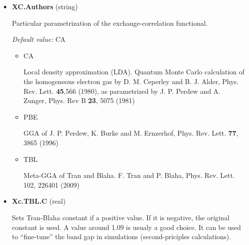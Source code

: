 \documentclass[11pt]{article}
\begin{document}
\begin{itemize}
  It is usual to have $m_{jj}$ an even number and $d_j = 0.5$.  For hexagonal crystals
  and the conventional axis, it is also usual/convenient to have $m_{11}=m_{22}$ a
  multiple of three.  These are recipes that minimize the number of irreducible points
  and avoid breaking symmetry.

  The tool \texttt{Tools/cpwin\_kmesh.f90} (section~\ref{sec:kmesh}) chooses a mesh with
  the symmetry of the lattice for a given quality, and evaluates the mesh of an existing file.

  If the matrix is diagonal and some diagonal elements are non-positive they will
  default to $m_{ii}=1$, printing a warning.  The program stops if the matrix is singular.

\item{\bf  XC.Authors} (string)

  Particular parametrization of the exchange-correlation
  functional.

  \textit{Default value:}  CA

  \begin{itemize}

    \item{CA}

    Local density approximation (LDA). Quantum Monte Carlo
    calculation of the homogeneous
    electron gas by D. M. Ceperley and B. J. Alder,
    Phys. Rev. Lett. \textbf{45},566 (1980), as parametrized by
    J. P. Perdew and A. Zunger, Phys. Rev B \textbf{23}, 5075 (1981)

   \item{PBE}

    GGA of J. P. Perdew, K. Burke and M. Ernzerhof,
    Phys. Rev. Lett. \textbf{77}, 3865 (1996)

   \item{TBL}

   Meta-GGA of Tran and Blaha.
   F. Tran and P. Blaha, Phys. Rev. Lett. 102, 226401 (2009)

  \end{itemize}

\item{\bf Xc.TBL.C} (real)

  Sets Tran-Blaha constant if a positive value.  If it is negative,
  the original constant is used.  A value around 1.09 is usualy a good choice.
  It can be used to ``fine-tune'' the band gap in simulations
  (second-priciples calculations).


\end{itemize}
\end{document}
